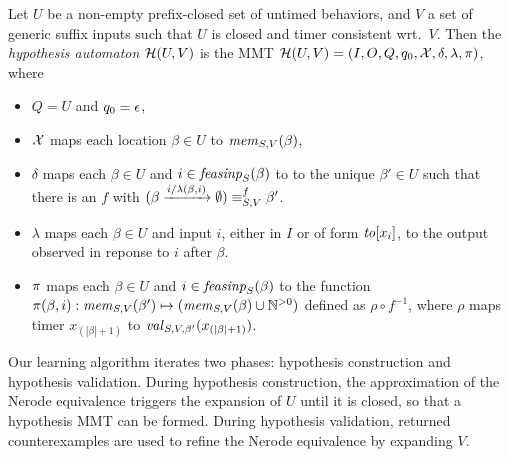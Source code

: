 \begin{definition}
  Let $U$ be a non-empty prefix-closed set of untimed behaviors,
  and $V$ a set of generic suffix inputs such that
$U$ is closed and timer consistent wrt.\ $V$. Then the
{\em hypothesis automaton} $\hypoof UV$ is the MMT
$\hypoof UV = (I, O, Q, q_0, \vars, \delta, \lambda, \remap)$, where
\begin{itemize}
\item $Q = U$ and $q_0 = \emptyword$,
\item $\vars$ maps each location $\beta\in U$ to $\getmemorable{S}{\beta}{V}$,
\item $\delta$ maps each $\beta \in U$ and
  $i \in \feasibleinputs{\beta}{S}$ to
  to the unique $\beta' \in U$ such that there is an $f$ with
  $\extend{\beta}{i}{\lambda(\beta,i)} \equiv_{S,V}^f \beta'$.
\item $\lambda$ maps each $\beta \in U$ and input
  $i$, either in $I$ or of form $\toevent{x_i}$, to the output observed in
  reponse to $i$ after $\beta$.
\item $\remap$
 maps each $\beta \in U$ and $i \in \feasibleinputs{\beta}{S}$ to
  the function
  $\remap(\beta,i):\getmemorable{S}{\beta'}{V} \mapsto (\getmemorable{S}{\beta}{V} \cup \natplus)$ defined as $\rho \circ f^{-1}$, where $\rho$ maps
  timer $x_{(|\beta|+1)}$ to
 $\getassignment{S}{\beta'}{V}(x_{(|\beta|+1)})$.
\end{itemize}
\end{definition}


Our learning algorithm iterates two phases: hypothesis construction and
hypothesis validation.
During hypothesis construction, 
the approximation of the Nerode equivalence triggers the expansion of
$U$ until it is closed, so that a hypothesis MMT can be formed.
During hypothesis validation, returned counterexamples are used to refine
the Nerode equivalence by expanding $V$.

